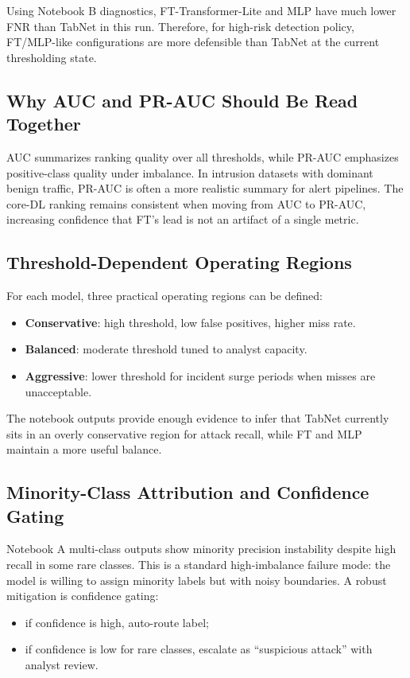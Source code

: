 \documentclass[10pt,journal]{IEEEtran}
\begin{document}
Using Notebook B diagnostics, FT-Transformer-Lite and MLP have much lower FNR than TabNet in this run. Therefore, for high-risk detection policy, FT/MLP-like configurations are more defensible than TabNet at the current thresholding state.

\subsection{Why AUC and PR-AUC Should Be Read Together}
AUC summarizes ranking quality over all thresholds, while PR-AUC emphasizes positive-class quality under imbalance. In intrusion datasets with dominant benign traffic, PR-AUC is often a more realistic summary for alert pipelines. The core-DL ranking remains consistent when moving from AUC to PR-AUC, increasing confidence that FT's lead is not an artifact of a single metric.

\subsection{Threshold-Dependent Operating Regions}
For each model, three practical operating regions can be defined:
\begin{itemize}
\item \textbf{Conservative}: high threshold, low false positives, higher miss rate.
\item \textbf{Balanced}: moderate threshold tuned to analyst capacity.
\item \textbf{Aggressive}: lower threshold for incident surge periods when misses are unacceptable.
\end{itemize}

The notebook outputs provide enough evidence to infer that TabNet currently sits in an overly conservative region for attack recall, while FT and MLP maintain a more useful balance.

\subsection{Minority-Class Attribution and Confidence Gating}
Notebook A multi-class outputs show minority precision instability despite high recall in some rare classes. This is a standard high-imbalance failure mode: the model is willing to assign minority labels but with noisy boundaries. A robust mitigation is confidence gating:
\begin{itemize}
\item if confidence is high, auto-route label;
\item if confidence is low for rare classes, escalate as ``suspicious attack'' with analyst review.
\end{itemize}
\end{document}
